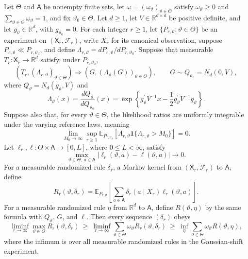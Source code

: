Let \(\Theta\) and \(\mathsf A\) be nonempty finite sets, let \(\omega=(\omega_\vartheta)_{\vartheta\in\Theta}\) satisfy \(\omega_\vartheta\geq0\) and \(\sum_{\vartheta\in\Theta}\omega_\vartheta=1\), and fix \(\vartheta_0\in\Theta\). Let \(d\geq1\), let \(V\in\mathbb R^{d\times d}\) be positive definite, and let \(g_\vartheta\in\mathbb R^d\), with \(g_{\vartheta_0}=0\). For each integer \(r\geq1\), let \(\{P_{r,\vartheta}:\vartheta\in\Theta\}\) be an experiment on \((\mathsf X_r,\mathcal F_r)\), write \(X_r\) for its canonical observation, suppose \(P_{r,\vartheta}\ll P_{r,\vartheta_0}\), and define \(\Lambda_{r,\vartheta}=dP_{r,\vartheta}/dP_{r,\vartheta_0}\). Suppose that measurable \(T_r:\mathsf X_r\to\mathbb R^d\) satisfy, under \(P_{r,\vartheta_0}\),
\[
 \left(T_r,(\Lambda_{r,\vartheta})_{\vartheta\in\Theta}\right)
 \Rightarrow
 \left(G,(\Lambda_\vartheta(G))_{\vartheta\in\Theta}\right),
 \qquad
 G\sim Q_{\vartheta_0}=N_d(0,V),
\]
where \(Q_\vartheta=N_d(g_\vartheta,V)\) and
\[
 \Lambda_\vartheta(x)=\frac{dQ_\vartheta}{dQ_{\vartheta_0}}(x)
 =\exp\!\left\{g_\vartheta^{\prime}V^{-1}x-
 \frac12g_\vartheta^{\prime}V^{-1}g_\vartheta\right\}.
\]
Suppose also that, for every \(\vartheta\in\Theta\), the likelihood ratios are uniformly integrable under the varying reference laws, meaning
\[
 \lim_{M_0\to\infty}\sup_{r\geq1}
 \mathbb E_{P_{r,\vartheta_0}}\!\left[
   \Lambda_{r,\vartheta}\mathbf 1\{\Lambda_{r,\vartheta}>M_0\}
 \right]=0.
\]
Let \(\ell_r,\ell:\Theta\times\mathsf A\to[0,L]\), where \(0\leq L<\infty\), satisfy
\[
 \max_{\vartheta\in\Theta,\ a\in\mathsf A}
 |\ell_r(\vartheta,a)-\ell(\vartheta,a)|\longrightarrow0.
\]
For a measurable randomized rule \(\delta_r\), a Markov kernel from \((\mathsf X_r,\mathcal F_r)\) to \(\mathsf A\), define
\[
 R_r(\vartheta,\delta_r)
 =\mathbb E_{P_{r,\vartheta}}\!\left[
   \sum_{a\in\mathsf A}\delta_r(a\mid X_r)\ell_r(\vartheta,a)
 \right].
\]
For a measurable randomized rule \(\eta\) from \(\mathbb R^d\) to \(\mathsf A\), define \(R(\vartheta,\eta)\) by the same formula with \(Q_\vartheta\), \(G\), and \(\ell\). Then every sequence \((\delta_r)\) obeys
\[
 \liminf_{r\to\infty}\max_{\vartheta\in\Theta}R_r(\vartheta,\delta_r)
 \ \geq\ 
 \liminf_{r\to\infty}\sum_{\vartheta\in\Theta}
       \omega_\vartheta R_r(\vartheta,\delta_r)
 \ \geq\ 
 \inf_\eta\sum_{\vartheta\in\Theta}
       \omega_\vartheta R(\vartheta,\eta),
\]
where the infimum is over all measurable randomized rules in the Gaussian-shift experiment.